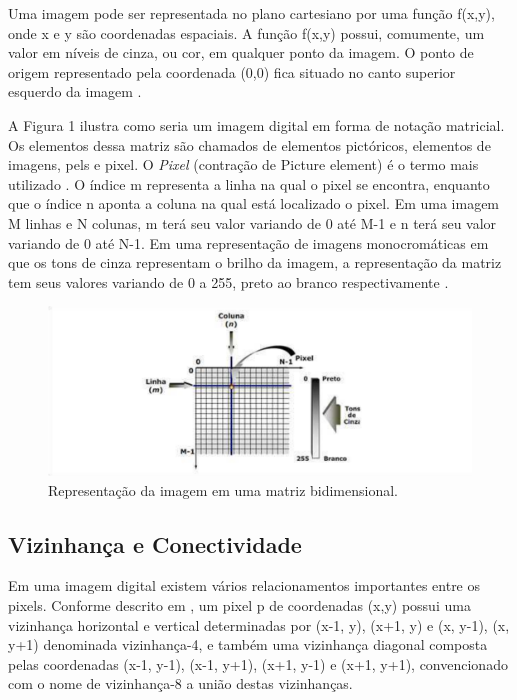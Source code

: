 Uma imagem pode ser representada no plano cartesiano por uma função f(x,y), onde x e y são coordenadas espaciais. A função f(x,y) possui, comumente, um valor em níveis de cinza, ou cor, em qualquer ponto da imagem. O ponto de origem representado pela coordenada (0,0) fica situado no canto superior esquerdo da imagem \cite{Goncalves2016}.

A Figura 1 ilustra como seria um imagem digital em forma de notação matricial. Os elementos dessa matriz são chamados de elementos pictóricos, elementos de imagens, pels e pixel. O \textit{Pixel} (contração de Picture element) é o termo mais utilizado \cite{GONZALEZ2006}. O índice m representa a linha na qual o pixel se encontra, enquanto que o índice n aponta a coluna na qual está localizado o pixel. Em uma imagem M linhas e N colunas, m terá seu valor variando de 0 até M-1 e n terá seu valor variando de 0 até N-1. Em uma representação de imagens monocromáticas em que os tons de cinza representam o brilho da imagem, a representação da matriz tem seus valores variando de 0 a 255, preto ao branco respectivamente \cite{Almeida2018}. 

 \begin{figure}[htb]
	\centering
	\includegraphics[width=1.0\textwidth]{Imagens/imagem1} 
	\caption[Texto que vai aparecer na lista de fig.]{Representação da imagem em uma matriz bidimensional.}
	\label{fig:tux_laplace}
\end{figure}


\subsection{Vizinhança e Conectividade}
Em uma imagem digital existem vários relacionamentos importantes entre os pixels. Conforme descrito em , 
um pixel p de coordenadas (x,y) possui uma vizinhança horizontal e vertical determinadas por (x-1, y), (x+1, y) e (x, y-1), (x, y+1) denominada vizinhança-4, e também uma vizinhança diagonal composta pelas coordenadas (x-1, y-1), (x-1, y+1), (x+1, y-1) e (x+1, y+1), convencionado com o nome de vizinhança-8 a união destas vizinhanças.

